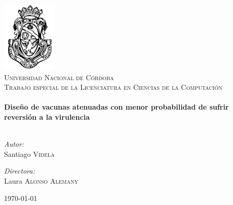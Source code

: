 \begin{titlepage}

\begin{center}

\includegraphics[scale=0.5]{famaf}\\[1cm]    

\textsc{\LARGE Universidad Nacional de C\'ordoba}\\[1.5cm]

\textsc{\Large Trabajo especial de la Licenciatura en Ciencias de la
Computaci\'on}\\[0.5cm]


\HRule \\[0.4cm]
{ \huge \bfseries Dise\~no de vacunas atenuadas con menor probabilidad de
sufrir reversi\'on a la virulencia}\\[0.4cm]

\HRule \\[1.5cm]

\begin{minipage}{0.4\textwidth}
\begin{flushleft} \large
\emph{Autor:}\\
Santiago \textsc{Videla}
\end{flushleft}
\end{minipage}
\begin{minipage}{0.4\textwidth}
\begin{flushright} \large
\emph{Directora:} \\
Laura \textsc{Alonso Alemany}
\end{flushright}
\end{minipage}

\vfill


{\large \today} 
\end{center}





\end{titlepage}